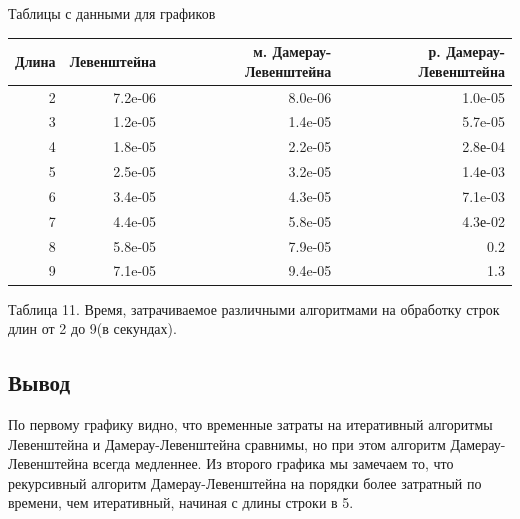 \documentclass[a4paper,12pt]{report}
\begin{document}
\begin{center}
\newpage
\begin{center}
	Таблицы с данными для графиков\\
	    \begin{tabular}{ | r | r | r | r | }
        \hline
Длина & Левенштейна & м. Дамерау-Левенштейна & р. Дамерау-Левенштейна \\ \hline
2 & 7.2e-06 & 8.0e-06 & 1.0e-05\\
3 & 1.2e-05 & 1.4e-05 & 5.7e-05\\
4 & 1.8e-05 & 2.2e-05 & 2.8е-04\\
5 & 2.5e-05 & 3.2e-05 & 1.4е-03\\
6 & 3.4e-05 & 4.3e-05 & 7.1e-03\\
7 & 4.4e-05 & 5.8e-05 & 4.3е-02\\
8 & 5.8e-05 & 7.9e-05 & 0.2\\
9 & 7.1e-05 & 9.4e-05 & 1.3\\
\hline
        \end{tabular}
        
      \begin{center}
  	Таблица 11. Время, затрачиваемое различными алгоритмами на обработку строк длин от 2 до 9(в секундах).
	\end{center}
\end{center}
	\begin{flushleft}
	\begin{center}
	\subsection{Вывод}
	\end{center}	
	По первому графику видно, что временные затраты на итеративный алгоритмы Левенштейна и Дамерау-Левенштейна сравнимы, но при этом алгоритм Дамерау-Левенштейна всегда медленнее. Из второго графика мы замечаем то, что рекурсивный алгоритм Дамерау-Левенштейна на порядки более затратный по времени, чем итеративный, начиная с длины строки в 5.
	\end{flushleft}
        
    \end{center}
\end{document}
